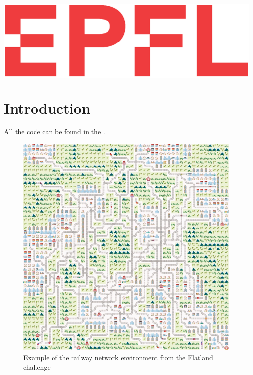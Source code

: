 \documentclass[14pt,a4paper]{article}
\theoremstyle{definition}
\numberwithin{equation}{subsection}
\begin{document}
\begin{titlepage}
\centering
 \includegraphics[width=0.5\linewidth]{img/logo.eps}\\ %

 
 

\vfill %


\end{titlepage}




\newpage





\tableofcontents
{}
\newpage






\section{Introduction}

All the code can be found in the \cite{GIT}.



\begin{figure}[H]
\centering
\includegraphics[scale=0.4]{img/flatland.png}
\caption{Example of the railway network environment from the Flatland challenge}
\end{figure}
\end{document}
